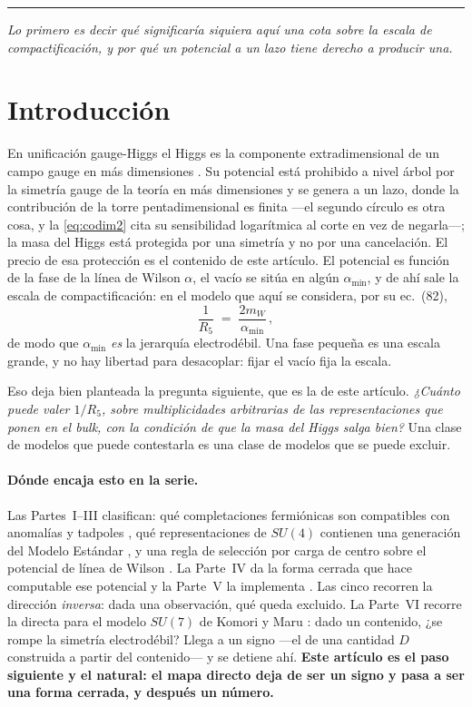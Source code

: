 \documentclass[11pt,a4paper]{article}
\newcommand{\su}[1]{SU(#1)}
\newcommand{\amin}{\alpha_{\min}}
\newcommand{\bridge}[1]{\par\medskip\noindent
  \textcolor{hdrblue!45}{\rule{2.2cm}{0.6pt}}\;\;\parbox[t]{0.84\textwidth}{\small\itshape
  \textcolor{hdrblue!85}{#1}}\par\medskip}
\begin{document}
\bridge{Lo primero es decir qué significaría siquiera aquí una cota sobre la escala de
compactificación, y por qué un potencial a un lazo tiene derecho a producir una.}

\section{Introducción}\label{sec:intro}

En unificación gauge-Higgs el Higgs es la componente extradimensional de un campo gauge en más
dimensiones \cite{Manton,Hosotani}. Su potencial está prohibido a nivel árbol por la simetría gauge
de la teoría en más dimensiones y se genera a un lazo, donde la contribución de la torre
pentadimensional es finita ---el segundo círculo es otra cosa, y la \eqref{eq:codim2} cita su
sensibilidad logarítmica al corte en vez de negarla---; la masa del Higgs está
protegida por una simetría y no por una cancelación. El precio de esa protección es el contenido de
este artículo. El potencial es función de la fase de la línea de Wilson $\alpha$, el vacío se sitúa
en algún $\amin$, y de ahí sale la escala de compactificación: en el modelo que aquí se considera,
por su ec.~(82),
\begin{equation}\label{eq:hier}
  \frac{1}{R_5} \;=\; \frac{2 m_W}{\amin}\,,
\end{equation}
de modo que $\amin$ \emph{es} la jerarquía electrodébil. Una fase pequeña es una escala grande, y no
hay libertad para desacoplar: fijar el vacío fija la escala.

Eso deja bien planteada la pregunta siguiente, que es la de este artículo. \emph{¿Cuánto puede valer
$1/R_5$, sobre multiplicidades arbitrarias de las representaciones que \cite{KM25} ponen en el
bulk, con la condición de que la masa del Higgs salga bien?} Una clase de modelos que puede contestarla es una clase de modelos que
se puede excluir.

\paragraph{Dónde encaja esto en la serie.} Las Partes~I--III clasifican: qué completaciones
fermiónicas son compatibles con anomalías y tadpoles \cite{PartI}, qué representaciones de $\su4$
contienen una generación del Modelo Estándar \cite{PartII}, y una regla de selección por carga de
centro sobre el potencial de línea de Wilson \cite{PartIII}. La Parte~IV da la forma cerrada que
hace computable ese potencial \cite{PartIV} y la Parte~V la implementa \cite{PartV}. Las cinco
recorren la dirección \emph{inversa}: dada una observación, qué queda excluido. La Parte~VI
\cite{PartVI} recorre la directa para el modelo $\su7$ de Komori y Maru \cite{KM25}: dado un
contenido, ¿se rompe la simetría electrodébil? Llega a un signo ---el de una cantidad $D$ construida
a partir del contenido--- y se detiene ahí. \textbf{Este artículo es el paso siguiente y el natural:
el mapa directo deja de ser un signo y pasa a ser una forma cerrada, y después un número.}
\end{document}
